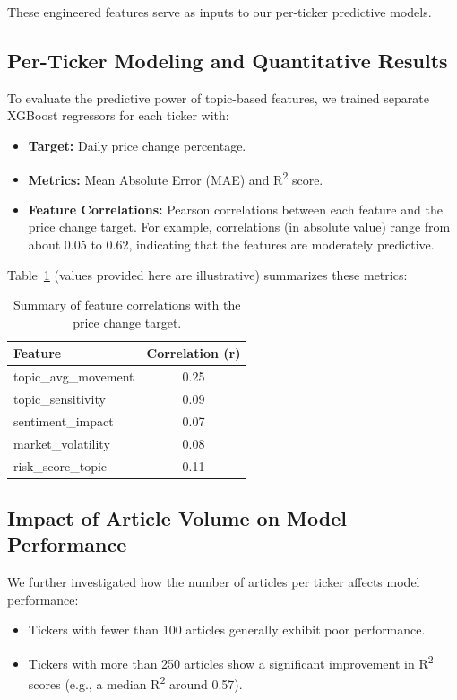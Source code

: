 \documentclass[twocolumn]{article}
\begin{document}
These engineered features serve as inputs to our per-ticker predictive models.

\subsection{Per-Ticker Modeling and Quantitative Results}
To evaluate the predictive power of topic-based features, we trained separate XGBoost regressors for each ticker with:
\begin{itemize}
    \item \textbf{Target:} Daily price change percentage.
    \item \textbf{Metrics:} Mean Absolute Error (MAE) and R\textsuperscript{2} score.
    \item \textbf{Feature Correlations:} Pearson correlations between each feature and the price change target. For example, correlations (in absolute value) range from about 0.05 to 0.62, indicating that the features are moderately predictive.
\end{itemize}

Table~\ref{tab:topic_model_results} (values provided here are illustrative) summarizes these metrics:

\begin{table}[h!]
\centering
\small
\begin{tabular}{|l|c|}
\hline
\textbf{Feature} & \textbf{Correlation (r)} \\
\hline
topic\_avg\_movement & 0.25 \\
topic\_sensitivity   & 0.09 \\
sentiment\_impact    & 0.07 \\
market\_volatility   & 0.08 \\
risk\_score\_topic   & 0.11 \\
\hline
\end{tabular}
\caption{Summary of feature correlations with the price change target.}
\label{tab:topic_model_results}
\end{table}

\subsection{Impact of Article Volume on Model Performance}
We further investigated how the number of articles per ticker affects model performance:
\begin{itemize}
    \item Tickers with fewer than 100 articles generally exhibit poor performance.
    \item Tickers with more than 250 articles show a significant improvement in R\textsuperscript{2} scores (e.g., a median R\textsuperscript{2} around 0.57).
\end{itemize}
\end{document}
